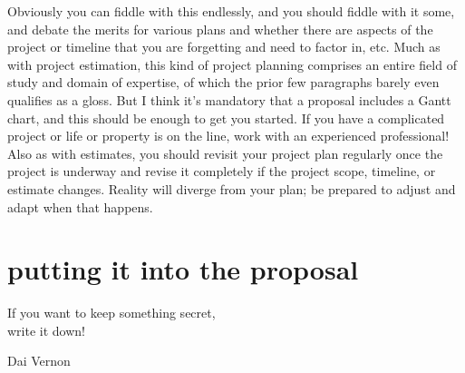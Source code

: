 \documentclass[12pt,oneside]{book}
\begin{document}
Obviously you can fiddle with this endlessly, and you should fiddle with it some, and debate the merits for various plans and whether there are aspects of the project or timeline that you are forgetting and need to factor in, etc. Much as with project estimation, this kind of project planning comprises an entire field of study and domain of expertise, of which the prior few paragraphs barely even qualifies as a gloss. But I think it's mandatory that a proposal includes a Gantt chart, and this should be enough to get you started. If you have a complicated project or life or property is on the line, work with an experienced professional! Also as with estimates, you should revisit your project plan regularly once the project is underway and revise it completely if the project scope, timeline, or estimate changes. Reality will diverge from your plan; be prepared to adjust and adapt when that happens.

\newpage
{}
\chapter*{putting it into the proposal}

\epigraph{If you want to keep something secret, \\write it down!}{Dai Vernon}%
\end{document}
